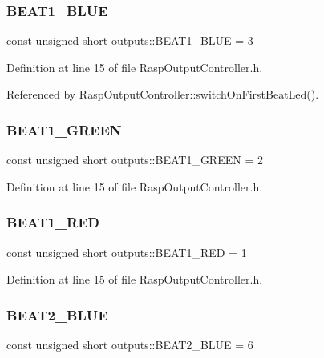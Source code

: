 \subsubsection{\texorpdfstring{B\+E\+A\+T1\+\_\+\+B\+L\+UE}{BEAT1\_BLUE}}
{\footnotesize\ttfamily const unsigned short outputs\+::\+B\+E\+A\+T1\+\_\+\+B\+L\+UE = 3}



Definition at line 15 of file Rasp\+Output\+Controller.\+h.



Referenced by Rasp\+Output\+Controller\+::switch\+On\+First\+Beat\+Led().

\mbox{\label{namespaceoutputs_ad934b2db0cff1421ca84b300dc257508}} 
\subsubsection{\texorpdfstring{B\+E\+A\+T1\+\_\+\+G\+R\+E\+EN}{BEAT1\_GREEN}}
{\footnotesize\ttfamily const unsigned short outputs\+::\+B\+E\+A\+T1\+\_\+\+G\+R\+E\+EN = 2}



Definition at line 15 of file Rasp\+Output\+Controller.\+h.

\mbox{\label{namespaceoutputs_ae1c055268c6bbfadcc272bc6028b1a59}} 
\subsubsection{\texorpdfstring{B\+E\+A\+T1\+\_\+\+R\+ED}{BEAT1\_RED}}
{\footnotesize\ttfamily const unsigned short outputs\+::\+B\+E\+A\+T1\+\_\+\+R\+ED = 1}



Definition at line 15 of file Rasp\+Output\+Controller.\+h.

\mbox{\label{namespaceoutputs_ac6bffee9716f79b218c8fb366351032e}} 
\subsubsection{\texorpdfstring{B\+E\+A\+T2\+\_\+\+B\+L\+UE}{BEAT2\_BLUE}}
{\footnotesize\ttfamily const unsigned short outputs\+::\+B\+E\+A\+T2\+\_\+\+B\+L\+UE = 6}



